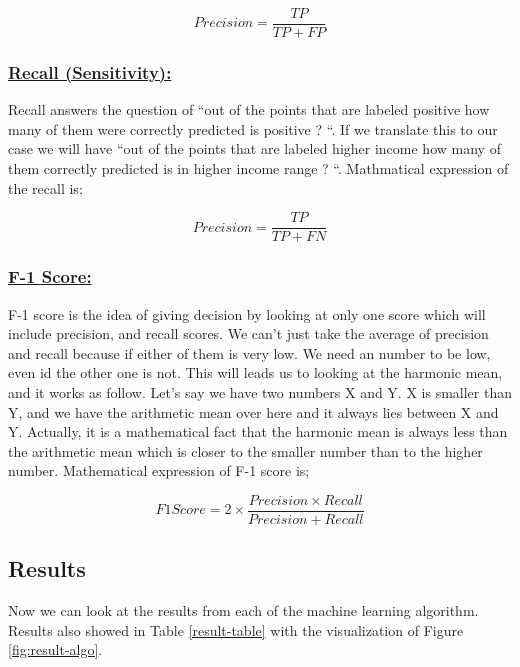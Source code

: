 \documentclass[sigconf]{acmart}
\begin{document}
\begin{equation}
Precision = \frac{TP} {TP + FP}
\end{equation}

\subsubsection{\textbf{\underline{Recall (Sensitivity):}}}

Recall answers the question of ``out of the points that are labeled positive how many of them were correctly predicted is positive ? ``. If we translate this to our case we will have ``out of the points that are labeled higher income how many of them correctly predicted is in higher income range ? ``. Mathmatical expression of the recall is; 

\begin{equation}
Precision = \frac{TP} {TP + FN}
\end{equation}

\subsubsection{\textbf{\underline{F-1 Score:}}}

F-1 score is the idea of giving decision by looking at only one score which will include  precision, and recall scores. We can't just take the average of precision and recall because if either of them is very low. We need an number to be low, even id the other one is not. This will leads us to looking at the harmonic mean, and it works as follow. Let's say we have two numbers X and Y. X is smaller than Y, and we have the arithmetic mean over here and it always lies between X and Y. Actually, it is a mathematical fact that the harmonic mean is always less than the arithmetic mean which is closer to the smaller number than to the higher number. Mathematical expression of F-1 score is; 

\begin{equation}
F1 Score = 2 \times {\frac{Precision \times Recall} {Precision + Recall}}
\end{equation}

\subsection{Results}
Now we can look at the results from each of the machine learning algorithm. Results also showed in Table \ref{result-table} with the visualization of Figure \ref{fig:result-algo}.
\end{document}
